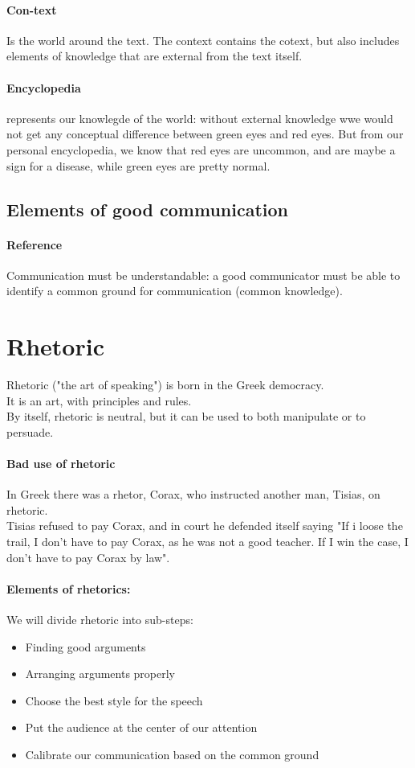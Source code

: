 \documentclass{article}
\begin{document}
\paragraph{Con-text} Is the world around the text. The context contains the cotext, but also includes elements of knowledge that are external from the text itself.
\paragraph{Encyclopedia} represents our knowlegde of the world: without external knowledge wwe would not get any conceptual difference between green eyes and red eyes. But from our personal encyclopedia, we know that red eyes are uncommon, and are maybe a sign for a disease, while green eyes are pretty normal.

\subsection{Elements of good communication}
\paragraph{Reference} Communication must be understandable: a good communicator must be able to identify a common ground for communication (common knowledge).




\section{Rhetoric}
Rhetoric ("the art of speaking") is born in the Greek democracy.\\
It is an art, with principles and rules.\\
By itself, rhetoric is neutral, but it can be used to both manipulate or to persuade.\\
\paragraph{Bad use of rhetoric} In Greek there was a rhetor, Corax, who instructed another man, Tisias, on rhetoric.\\
Tisias refused to pay Corax, and in court he defended itself saying "If i loose the trail, I don't have to pay Corax, as he was not a good teacher. If I win the case, I don't have to pay Corax by law".
\paragraph{Elements of  rhetorics:} We will divide rhetoric into sub-steps:
\begin{itemize}
\item Finding good arguments
\item Arranging arguments properly
\item Choose the best style for the speech
\item Put the audience at the center of our attention
\item Calibrate our communication based on the common ground
\end{itemize}
\end{document}
